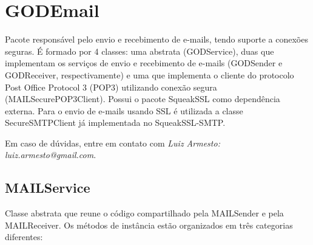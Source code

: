 \section{GODEmail}

Pacote responsável pelo envio e recebimento de e-mails, tendo suporte a conexões seguras. É formado por 4 classes: uma abstrata (GODService), duas que implementam os serviços de envio e recebimento de e-mails (GODSender e GODReceiver, respectivamente) e uma que implementa o cliente do protocolo Post Office Protocol 3 (POP3) utilizando conexão segura (MAILSecurePOP3Client). Possui o pacote SqueakSSL como dependência externa. Para o envio de e-mails usando SSL é utilizada a classe SecureSMTPClient já implementada no SqueakSSL-SMTP.

Em caso de dúvidas, entre em contato com \emph{Luiz Armesto: luiz.armesto@gmail.com}.

\subsection{MAILService}

Classe abstrata que reune o código compartilhado pela MAILSender e pela MAILReceiver. Os métodos de instância estão organizados em três categorias diferentes:

